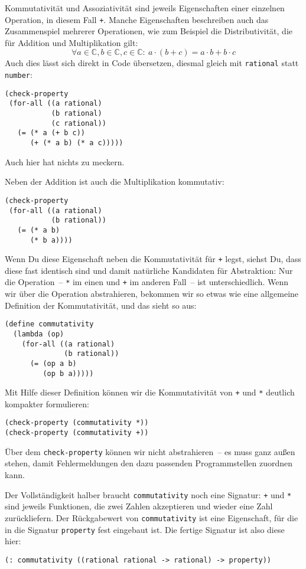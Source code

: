 Kommutativität und Assoziativität sind jeweils Eigenschaften einer
einzelnen Operation, in diesem Fall \lstinline{+}.  Manche Eigenschaften
beschreiben auch das Zusammenspiel mehrerer Operationen, wie zum
Beispiel die Distributivität, die für Addition und Multiplikation
gilt:
%
\begin{displaymath}
\forall a \in \mathbb{C}, b \in \mathbb{C}, c \in \mathbb{C}:\
a\cdot(b+c) = a\cdot b + b\cdot c
\end{displaymath}
%
Auch dies lässt sich direkt in Code übersetzen, diesmal gleich mit
\lstinline{rational} statt \lstinline{number}:
%
\begin{lstlisting}
(check-property
 (for-all ((a rational)
           (b rational)
           (c rational))
   (= (* a (+ b c))
      (+ (* a b) (* a c)))))
\end{lstlisting}
%
Auch hier hat \drscheme{} nichts zu meckern.

Neben der Addition ist auch die Multiplikation kommutativ:
%
\begin{lstlisting}
(check-property
 (for-all ((a rational)
           (b rational))
   (= (* a b)
      (* b a))))
\end{lstlisting}
%
Wenn Du diese Eigenschaft neben die Kommutativität für \lstinline{+}
legst, siehst Du, dass diese fast identisch sind und damit natürliche
Kandidaten für Abstraktion: Nur die Operation~-- \lstinline{*} im einen
und \lstinline{+} im anderen Fall~-- ist unterschiedlich.  Wenn wir über
die Operation abstrahieren, bekommen wir so etwas wie eine allgemeine
Definition der Kommutativität, und das sieht so aus:

\begin{lstlisting}
(define commutativity
  (lambda (op)
    (for-all ((a rational)
              (b rational))
      (= (op a b)
         (op b a)))))
\end{lstlisting}
%
Mit Hilfe dieser Definition können wir die Kommutativität von
\lstinline{+} und \lstinline{*} deutlich kompakter formulieren:
%
\begin{lstlisting}
(check-property (commutativity *))
(check-property (commutativity +))
\end{lstlisting}
%
Über dem \lstinline{check-property} können wir nicht abstrahieren~-- es
muss ganz außen stehen, damit \drscheme{} Fehlermeldungen den dazu
passenden Programmstellen zuordnen kann.

Der Vollständigkeit halber braucht \lstinline{commutativity} noch eine
Signatur: \lstinline{+} und \lstinline{*} sind jeweils Funktionen, die zwei
Zahlen akzeptieren und wieder eine Zahl zurückliefern.  Der
Rückgabewert von \lstinline{commutativity} ist eine Eigenschaft, für die
in \drscheme{} die Signatur \lstinline{property} fest eingebaut ist.  Die
fertige Signatur ist also diese hier:
%
\begin{lstlisting}
(: commutativity ((rational rational -> rational) -> property))
\end{lstlisting}

